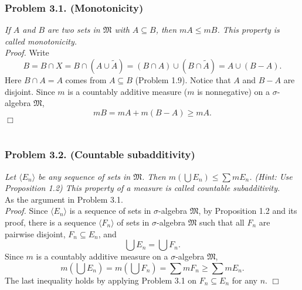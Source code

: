 \documentclass{article}
\begin{document}
\subsubsection*{Problem 3.1. (Monotonicity)}
\emph{If $A$ and $B$ are two sets in $\mathfrak{M}$ with
$A \subseteq B$, then $mA \leq mB$.
This property is called monotonicity.} \\



\emph{Proof.}
Write
\[
  B
  = B \cap X
  = B \cap (A \cup \widetilde{A})
  = (B \cap A) \cup (B \cap \widetilde{A})
  = A \cup (B - A).
\]
Here $B \cap A = A$ comes from $A \subseteq B$ (Problem 1.9).
Notice that $A$ and $B - A$ are disjoint.
Since $m$ is a countably additive measure ($m$ is nonnegative)
on a $\sigma$-algebra $\mathfrak{M}$,
\[
  mB = mA + m(B-A) \geq mA.
\]
$\Box$ \\\\






\subsubsection*{Problem 3.2. (Countable subadditivity)}
\emph{Let $\langle E_n \rangle$ be any sequence of sets in $\mathfrak{M}$.
Then $m(\bigcup E_n) \leq \sum mE_n$. (Hint: Use Proposition 1.2)
This property of a measure is called countable subadditivity.} \\

As the argument in Problem 3.1. \\



\emph{Proof.}
Since $\langle E_n \rangle$ is a sequence of sets in $\sigma$-algebra $\mathfrak{M}$,
by Proposition 1.2 and its proof,
there is a sequence $\langle F_n \rangle$ of sets in $\sigma$-algebra $\mathfrak{M}$
such that all $F_n$ are pairwise disjoint, $F_n \subseteq E_n$, and
$$\bigcup E_n = \bigcup F_n.$$
Since $m$ is a countably additive measure
on a $\sigma$-algebra $\mathfrak{M}$,
\[
  m\left( \bigcup E_n \right)
  = m\left( \bigcup F_n \right)
  = \sum mF_n
  \geq \sum mE_n.
\]
The last inequality holds by applying Problem 3.1 on $F_n \subseteq E_n$ for any $n$.
$\Box$ \\\\
\end{document}
